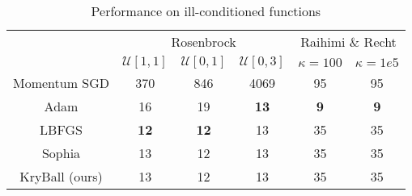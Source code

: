 \begin{table}[h]
    \centering
    \caption{Performance on ill-conditioned functions}\label{tab:ill-conditioned-functions}
    \begin{tabular}{cccccc}
        \toprule
         & \multicolumn{3}{c}{Rosenbrock} & \multicolumn{2}{c}{Raihimi \& Recht} \\
         & $\mathcal{U}[1,1]$ & $\mathcal{U}[0,1]$ & $\mathcal{U}[0,3]$ & $\kappa=100$ & $\kappa=1e5$ \\
        \midrule
        Momentum SGD & 370 & 846 & 4069 & 95 & 95 \\
        Adam & 16 & 19 & \textbf{13}\cellcolor{green!50} & \textbf{9}\cellcolor{green!50} & \textbf{9}\cellcolor{green!50} \\
        \midrule
        LBFGS & \textbf{12}\cellcolor{green!50} & \textbf{12}\cellcolor{green!50} & 13 & 35 & 35 \\
        Sophia & 13 & 12 & 13 & 35 & 35 \\
        \midrule
        KryBall (ours) & 13 & 12 & 13 & 35 & 35 \\
        \bottomrule
    \end{tabular}
    
\end{table}